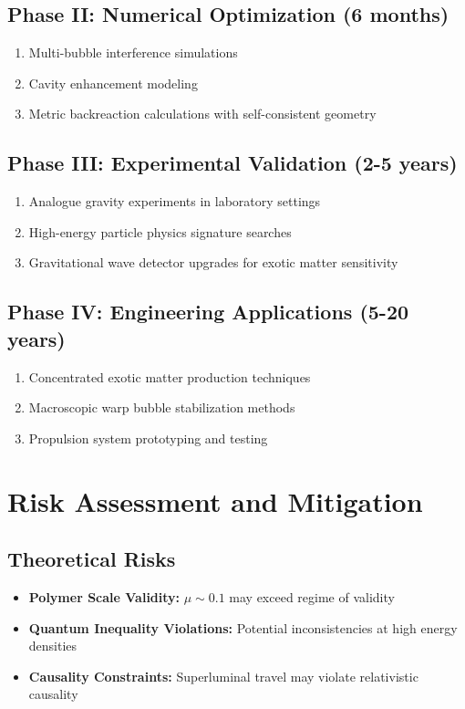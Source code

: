 \documentclass[11pt]{article}
\begin{document}
\subsection{Phase II: Numerical Optimization (6 months)}
\begin{enumerate}
  \item Multi-bubble interference simulations
  \item Cavity enhancement modeling
  \item Metric backreaction calculations with self-consistent geometry
\end{enumerate}

\subsection{Phase III: Experimental Validation (2-5 years)}
\begin{enumerate}
  \item Analogue gravity experiments in laboratory settings
  \item High-energy particle physics signature searches
  \item Gravitational wave detector upgrades for exotic matter sensitivity
\end{enumerate}

\subsection{Phase IV: Engineering Applications (5-20 years)}
\begin{enumerate}
  \item Concentrated exotic matter production techniques
  \item Macroscopic warp bubble stabilization methods
  \item Propulsion system prototyping and testing
\end{enumerate}

\section{Risk Assessment and Mitigation}

\subsection{Theoretical Risks}
\begin{itemize}
  \item \textbf{Polymer Scale Validity:} $\mu \sim 0.1$ may exceed regime of validity
  \item \textbf{Quantum Inequality Violations:} Potential inconsistencies at high energy densities
  \item \textbf{Causality Constraints:} Superluminal travel may violate relativistic causality
\end{itemize}
\end{document}
